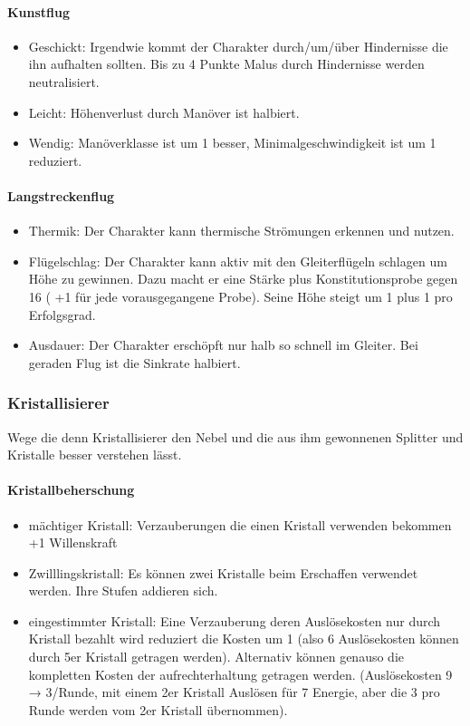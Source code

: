 \documentclass{article}
\begin{document}
\paragraph{Kunstflug}

\begin{itemize}
\item Geschickt: Irgendwie kommt der Charakter durch/um/über Hindernisse die ihn aufhalten sollten. Bis zu 4 Punkte Malus durch Hindernisse werden neutralisiert.
\item Leicht: Höhenverlust durch Manöver ist halbiert.
\item Wendig: Manöverklasse ist um 1 besser, Minimalgeschwindigkeit ist um 1 reduziert.
\end{itemize}

\paragraph{Langstreckenflug}

\begin{itemize}
\item Thermik: Der Charakter kann thermische Strömungen erkennen und nutzen.
\item Flügelschlag: Der Charakter kann aktiv mit den Gleiterflügeln schlagen um Höhe zu gewinnen. Dazu macht er eine Stärke plus Konstitutionsprobe gegen 16 ( +1 für jede vorausgegangene Probe). Seine Höhe steigt um 1 plus 1 pro Erfolgsgrad.
\item Ausdauer: Der Charakter erschöpft nur halb so schnell im Gleiter. Bei geraden Flug ist die Sinkrate halbiert.
\end{itemize}

\subsubsection{Kristallisierer}

Wege die denn Kristallisierer den Nebel und die aus ihm gewonnenen Splitter und Kristalle besser verstehen lässt.

\paragraph{Kristallbeherschung}

\begin{itemize}
\item mächtiger Kristall: Verzauberungen die einen Kristall verwenden bekommen +1 Willenskraft
\item Zwilllingskristall: Es können zwei Kristalle beim Erschaffen verwendet werden. Ihre Stufen addieren sich.
\item eingestimmter Kristall: Eine Verzauberung deren Auslösekosten nur durch Kristall bezahlt wird reduziert die Kosten um 1 (also 6 Auslösekosten können durch 5er Kristall getragen werden). Alternativ können genauso die kompletten Kosten der aufrechterhaltung getragen werden. (Auslösekosten 9 → 3/Runde, mit einem 2er Kristall Auslösen für 7 Energie, aber die 3 pro Runde werden vom 2er Kristall übernommen).
\end{itemize}
\end{document}

